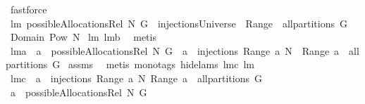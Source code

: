 \begin{isabellebody}
%
\isadelimproof
%
\endisadelimproof
%
\isatagproof
{}\isamarkupfalse%
\ fastforce%
\endisatagproof
{\isafoldproof}%
%
\isadelimproof
\isanewline
%
\endisadelimproof
\isanewline
{}\isamarkupfalse%
\ lm{}{}{\isacharcolon}\ {\isachardoublequoteopen}possibleAllocationsRel\ N\ G\ {\isacharequal}\ injectionsUniverse\ {\isasyminter}\ {\isacharparenleft}{\isacharparenleft}Range\ {\isacharminus}{\isacharbackquote}\ {\isacharparenleft}all{\isacharunderscore}partitions\ G{\isacharparenright}{\isacharparenright}\isanewline
{\isasyminter}\ {\isacharparenleft}Domain\ {\isacharminus}{\isacharbackquote}{\isacharparenleft}Pow\ N{\isacharparenright}{\isacharparenright}{\isacharparenright}{\isachardoublequoteclose}\isanewline
%
\isadelimproof
%
\endisadelimproof
%
\isatagproof
{}\isamarkupfalse%
\ lm{}{}\ lm{}{}b\ \isamarkupfalse%
\ metis%
\endisatagproof
{\isafoldproof}%
%
\isadelimproof
\ \isanewline
%
\endisadelimproof
\isanewline
{}\isamarkupfalse%
\ lm{}{}a{\isacharcolon}\ \ {\isachardoublequoteopen}a\ {\isasymin}\ possibleAllocationsRel\ N\ G{\isachardoublequoteclose}\ \ {\isachardoublequoteopen}{\isacharparenleft}a{\isacharcircum}{\isacharminus}{}\ {\isasymin}\ injections\ {\isacharparenleft}Range\ a{\isacharparenright}\ N\ {\isacharampersand}\ Range\ a\ {\isasymin}\ all{\isacharunderscore}partitions\ G{\isacharparenright}{\isachardoublequoteclose}\isanewline
%
\isadelimproof
%
\endisadelimproof
%
\isatagproof
{}\isamarkupfalse%
\ assms\ \isanewline
{}\isamarkupfalse%
\ {\isacharparenleft}metis\ {\isacharparenleft}mono{\isacharunderscore}tags{\isacharcomma}\ hide{\isacharunderscore}lams{\isacharparenright}\ lm{}{}c\ lm{}{}{\isacharparenright}%
\endisatagproof
{\isafoldproof}%
%
\isadelimproof
\isanewline
%
\endisadelimproof
\isanewline
{}\isamarkupfalse%
\ lm{}{}c{\isacharcolon}\ \ {\isachardoublequoteopen}a{\isacharcircum}{\isacharminus}{}\ {\isasymin}\ injections\ {\isacharparenleft}Range\ a{\isacharparenright}\ N{\isachardoublequoteclose}\ {\isachardoublequoteopen}Range\ a\ {\isasymin}\ all{\isacharunderscore}partitions\ G{\isachardoublequoteclose}\ \isanewline
{}\ {\isachardoublequoteopen}a\ {\isasymin}\ possibleAllocationsRel\ N\ G{\isachardoublequoteclose}%
\isadelimproof
\ %
\endisadelimproof

\end{isabellebody}
